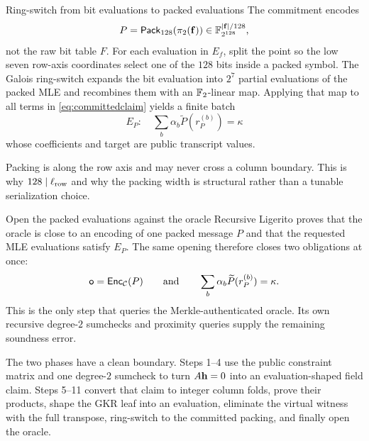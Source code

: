 \begin{step}{Ring-switch from bit evaluations to packed evaluations}{%
}\label{step:ringswitch}
The commitment encodes
\[
  P=\mathsf{Pack}_{128}(\pi_2(\mathbf{f}))\in\mathbb{F}_{2^{128}}^{|\mathbf{f}|/128},
\]
not the raw bit table $F$.  For each evaluation in $E_f$, split the point so
the low seven row-axis coordinates select one of the $128$ bits inside a packed
symbol.  The Galois ring-switch expands the bit evaluation into $2^7$ partial
evaluations of the packed MLE and recombines them with an $\mathbb{F}_2$-linear map.
Applying that map to all terms in \eqref{eq:committedclaim} yields a finite batch
\[
  \boxed{
  E_P:\quad
  \sum_b\alpha_b\widetilde P(r_P^{(b)})=\kappa}       \tag{4.16}
\]
whose coefficients and target are public transcript values.

Packing is along the row axis and may never cross a column boundary.  This is
why $128\mid\ell_{\mathrm{row}}$ and why the packing width is structural rather than a
tunable serialization choice.

\end{step}

\begin{step}{Open the packed evaluations against the oracle}{%
}\label{step:proximity}
Recursive Ligerito proves that the oracle is close to an encoding of one packed
message $P$ and that the requested MLE evaluations satisfy $E_P$.  The same
opening therefore closes two obligations at once:
\[
  \mathsf{o}=\mathsf{Enc}_{\mathcal{C}}(P)
  \qquad\text{and}\qquad
  \sum_b\alpha_b\widetilde P(r_P^{(b)})=\kappa.
\]
This is the only step that queries the Merkle-authenticated oracle.  Its own
recursive degree-$2$ sumchecks and proximity queries supply the remaining
soundness error.

\end{step}

\noindent
The two phases have a clean boundary.  Steps 1--4 use the public constraint
matrix and one degree-$2$ sumcheck to turn $A\mathbf{h}=0$ into an evaluation-shaped
field claim.  Steps 5--11 convert that claim to integer column folds, prove
their products, shape the GKR leaf into an
evaluation, eliminate the virtual witness with the full transpose, ring-switch
to the committed packing, and finally open the oracle.

